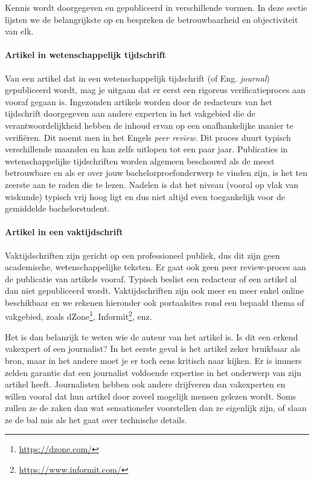 Kennis wordt doorgegeven en gepubliceerd in verschillende vormen. In deze sectie lijsten we de belangrijkste op en bespreken de betrouwbaarheid en objectiviteit van elk.

\paragraph{Artikel in wetenschappelijk tijdschrift}

Van een artikel dat in een wetenschappelijk tijdschrift (of Eng. \emph{journal}) gepubliceerd wordt, mag je uitgaan dat er eerst een rigoreus verificatieproces aan vooraf gegaan is. Ingezonden artikels worden door de redacteurs van het tijdschrift doorgegeven aan andere experten in het vakgebied die de verantwoordelijkheid hebben de inhoud ervan op een onafhankelijke manier te verifiëren. Dit noemt men in het Engels \emph{peer review}. Dit proces duurt typisch verschillende maanden en kan zelfs uitlopen tot een paar jaar. Publicaties in wetenschappelijke tijdschriften worden algemeen beschouwd als de meest betrouwbare en als er over jouw bachelorproefonderwerp te vinden zijn, is het ten zeerste aan te raden die te lezen. Nadelen is dat het niveau (vooral op vlak van wiskunde) typisch vrij hoog ligt en dus niet altijd even toegankelijk voor de gemiddelde bachelorstudent.

\paragraph{Artikel in een vaktijdschrift}

Vaktijdschriften zijn gericht op een professioneel publiek, dus dit zijn geen academische, wetenschappelijke teksten. Er gaat ook geen peer review-proces aan de publicatie van artikels vooraf. Typisch beslist een redacteur of een artikel al dan niet gepubliceerd wordt. Vaktijdschriften zijn ook meer en meer enkel online beschikbaar en we rekenen hieronder ook portaalsites rond een bepaald thema of vakgebied, zoals dZone\footnote{\url{https://dzone.com/}}, Informit\footnote{\url{https://www.informit.com/}}, enz.

Het is dan belanrijk te weten wie de auteur van het artikel is. Is dit een erkend vakexpert of een journalist? In het eerste geval is het artikel zeker bruikbaar als bron, maar in het andere moet je er toch eens kritisch naar kijken. Er is immers zelden garantie dat een journalist voldoende expertise in het onderwerp van zijn artikel heeft. Journalisten hebben ook andere drijfveren dan vakexperten en willen vooral dat hun artikel door zoveel mogelijk mensen gelezen wordt. Soms zullen ze de zaken dan wat sensationeler voorstellen dan ze eigenlijk zijn, of slaan ze de bal mis als het gaat over technische details.

